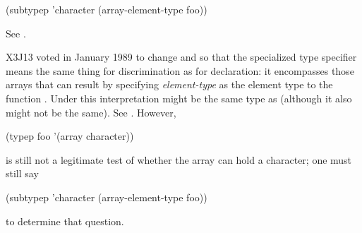 \begin{flushdesc}
\begin{lisp}
(subtypep 'character (array-element-type foo))
\end{lisp}
See .
\begin{new}
X3J13 voted in January 1989
to change  and 
so that the specialized  type specifier
means the same thing for discrimination
as for declaration: it encompasses those arrays
that can result by specifying {\it element-type} as the element type
to the function .
Under this interpretation  might be
the same type as 
(although it also might not be the same).
See .
However,
\begin{lisp}
(typep foo '(array character))
\end{lisp}
is still not a legitimate test of whether the array
 can hold a character; one must still say
\begin{lisp}
(subtypep 'character (array-element-type foo))
\end{lisp}
to determine that question.


\end{new}
\end{flushdesc}

